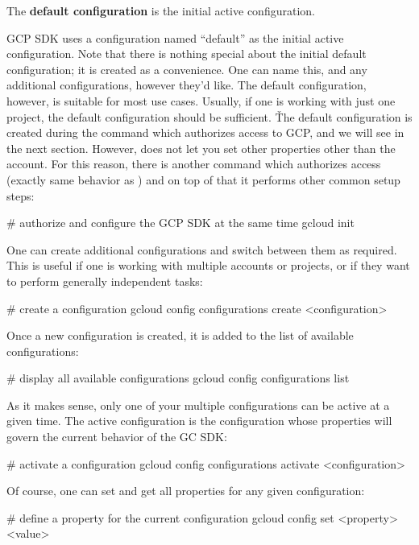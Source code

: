 The \textbf{default configuration} is the initial active configuration.
\ed

GCP SDK uses a configuration named ``default'' as the initial active configuration. Note that there is nothing special
about the initial default configuration; it is created as a convenience. One can name this, and any additional
configurations, however they'd like. The default configuration, however, is suitable for most use cases. Usually, if
one is working with just one project, the default configuration should be sufficient. \v

The default configuration is created during the  command which authorizes access to GCP\@, and
we will see in the next section. However,  does not let you set other properties other than the
account. For this reason, there is another command  which authorizes access (exactly same behavior as
) and on top of that it performs other common setup steps:
\begin{bash}
# authorize and configure the GCP SDK at the same time
gcloud init
\end{bash}

One can create additional configurations and switch between them as required. This is useful if one is working with
multiple accounts or projects, or if they want to perform generally independent tasks:
\begin{bash}
# create a configuration
gcloud config configurations create <configuration>
\end{bash}

Once a new configuration is created, it is added to the list of available configurations:
\begin{bash}
# display all available configurations
gcloud config configurations list
\end{bash}

As it makes sense, only one of your multiple configurations can be active at a given time. The active configuration
is the configuration whose properties will govern the current behavior of the GC SDK\@:
\begin{bash}
# activate a configuration
gcloud config configurations activate <configuration>
\end{bash}

Of course, one can set and get all properties for any given configuration:
\begin{bash}
# define a property for the current configuration
gcloud config set <property> <value>
\end{bash}

